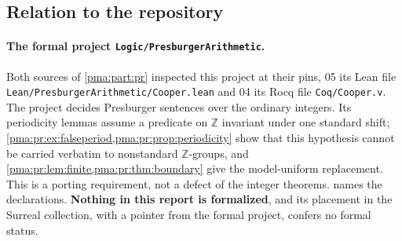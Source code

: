 \documentclass[11pt]{article}
\numberwithin{equation}{section}
\theoremstyle{definition}
\theoremstyle{remark}
\newcommand{\Z}{\mathbb Z}
\newcommand{\fn}[1]{\nolinkurl{#1}}
\begin{document}
\subsection{Relation to the repository}\label{pma:sec:repo}

\paragraph{The formal project \fn{Logic/PresburgerArithmetic}.} Both sources of
\cref{pma:part:pr} inspected this project at their pins, 05 its Lean file
\fn{Lean/PresburgerArithmetic/Cooper.lean} and 04 its Rocq file
\fn{Coq/Cooper.v}. The project decides Presburger sentences over the ordinary
integers. Its periodicity lemmas assume a predicate on $\Z$ invariant under one
standard shift; \cref{pma:pr:ex:falseperiod,pma:pr:prop:periodicity} show that
this hypothesis cannot be carried verbatim to nonstandard $\Z$-groups, and
\cref{pma:pr:lem:finite,pma:pr:thm:boundary} give the model-uniform
replacement. This is a porting requirement, not a defect of the integer
theorems.  names the declarations. \textbf{Nothing
in this report is formalized}, and its placement in the Surreal collection,
with a pointer from the formal project, confers no formal status.
\end{document}
